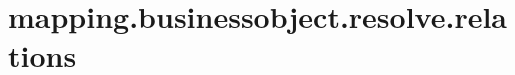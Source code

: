 \section{mapping.businessobject.resolve.relations}
\label{configuration:MappingBusinessobjectResolveRelations}
\TODO
